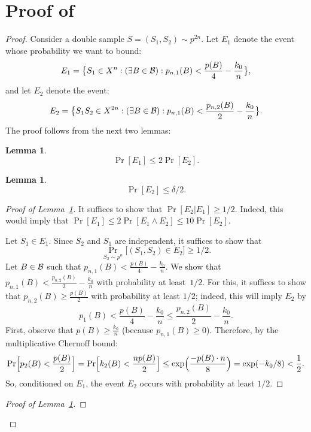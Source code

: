 \documentclass{article}
\newtheorem{lemma}[theorem]{Lemma}
\newcommand{\B}{{\cal B}}
\newcommand{\samp}{S}
\begin{document}
\section{Proof of }\label{sec:auxuc}
\begin{proof}
Consider a double sample $S=(\samp_1,\samp_2)\sim p^{2n}$.
Let $E_1$ denote the event whose probability we want to bound:
\[
E_1 = \bigl\{S_1\in X^n : (\exists B\in\B): p_{n,1}(B) < \frac{p(B)}{4} - \frac{k_0}{n} \bigr\},
\]
and let $E_2$ denote the event:
\[
E_2 = \bigl\{S_1S_2\in X^{2n} : (\exists B\in\B): p_{n,1}(B) < \frac{p_{n,2}(B)}{2} - \frac{k_0}{n} \bigr\}.
\]
The proof follows from the next two lemmas:
\begin{lemma}\label{lem:auxuc1}
\[\Pr[E_1]\leq 2\Pr[E_2].\]
\end{lemma}
\begin{lemma}\label{lem:auxuc2}
\[\Pr[E_2]\leq \delta/2.\]
\end{lemma}
\begin{proof}[Proof of Lemma~\ref{lem:auxuc1}]
It suffices to show that $\Pr[E_2 \vert E_1]\geq 1/2$.
Indeed, this would imply that 
$\Pr[E_1] \leq 2\Pr[E_1 \land E_2]\leq 10\Pr[E_2]$.

Let $S_1\in E_1$. Since $S_2$ and $S_1$ are independent,
it suffices to show that 
\[\Pr_{S_2\sim p^n}\bigl[(S_1,S_2)\in E_2\bigr] \geq 1/2.\]
Let $B\in\B$ such that $p_{n,1}(B)< \frac{p(B)}{4} - \frac{k_0}{n}$.
We show that $p_{n,1}(B) < \frac{p_{n,2}(B)}{2} - \frac{k_0}{n}$ with probability at least~$1/2$.
For this, it suffices to show that $p_{n,2}(B)\geq \frac{p(B)}{2}$ with probability at least $1/2$;
indeed, this will imply $E_2$ by
\[p_1(B) < \frac{p(B)}{4}- \frac{k_0}{n} \leq  \frac{p_{n,2}(B)}{2}- \frac{k_0}{n}.\]
First, observe that $p(B) \geq \frac{k_0}{n}$ (because $p_{n,1}(B) \geq 0$).
Therefore, by the multiplicative Chernoff bound:
\[
\Pr\Bigl[ p_2(B) < \frac{p(B)}{2}\Bigr]
=
\Pr\Bigl[ k_2(B) < \frac{np(B)}{2}\Bigr]
\leq
\exp\Bigl( \frac{-p(B)\cdot n}{8}\Bigr) = \exp(-k_0/8)< \frac{1}{2}.
\]
So, conditioned on $E_1$, 
the event $E_2$ occurs with probability at least $1/2$.


\end{proof}

\begin{proof}[Proof of Lemma~\ref{lem:auxuc2}]


\end{proof}
\end{proof}
\end{document}
